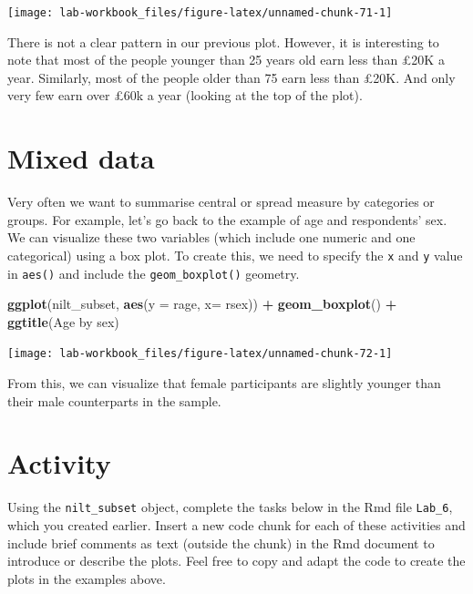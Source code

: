 \documentclass[
]{book}
\newenvironment{Shaded}{\begin{snugshade}}{\end{snugshade}}
\newcommand{\AttributeTok}[1]{\textcolor[rgb]{0.13,0.29,0.53}{#1}}
\newcommand{\FunctionTok}[1]{\textcolor[rgb]{0.13,0.29,0.53}{\textbf{#1}}}
\newcommand{\NormalTok}[1]{#1}
\newcommand{\SpecialCharTok}[1]{\textcolor[rgb]{0.81,0.36,0.00}{\textbf{#1}}}
\newcommand{\StringTok}[1]{\textcolor[rgb]{0.31,0.60,0.02}{#1}}
\begin{document}
\begin{flushleft}\texttt{[image: lab-workbook\_files/figure-latex/unnamed-chunk-71-1]} \end{flushleft}

There is not a clear pattern in our previous plot. However, it is interesting to note that most of the people younger than 25 years old earn less than £20K a year. Similarly, most of the people older than 75 earn less than £20K. And only very few earn over £60k a year (looking at the top of the plot).

\hypertarget{mixed-data}{%
\section{Mixed data}\label{mixed-data}}

Very often we want to summarise central or spread measure by categories or groups. For example, let's go back to the example of age and respondents' sex. We can visualize these two variables (which include one numeric and one categorical) using a box plot. To create this, we need to specify the \texttt{x} and \texttt{y} value in \texttt{aes()} and include the \texttt{geom\_boxplot()} geometry.

\begin{Shaded}
\begin{Highlighting}[]
\FunctionTok{ggplot}\NormalTok{(nilt\_subset, }\FunctionTok{aes}\NormalTok{(}\AttributeTok{y =}\NormalTok{ rage, }\AttributeTok{x=}\NormalTok{ rsex)) }\SpecialCharTok{+}
  \FunctionTok{geom\_boxplot}\NormalTok{() }\SpecialCharTok{+}
  \FunctionTok{ggtitle}\NormalTok{(}\StringTok{\textquotesingle{}Age by sex\textquotesingle{}}\NormalTok{)}
\end{Highlighting}
\end{Shaded}

\begin{flushleft}\texttt{[image: lab-workbook\_files/figure-latex/unnamed-chunk-72-1]} \end{flushleft}

From this, we can visualize that female participants are slightly younger than their male counterparts in the sample.

\hypertarget{activity-6}{%
\section{Activity}\label{activity-6}}

Using the \texttt{nilt\_subset} object, complete the tasks below in the Rmd file \texttt{Lab\_6}, which you created earlier. Insert a new code chunk for each of these activities and include brief comments as text (outside the chunk) in the Rmd document to introduce or describe the plots. Feel free to copy and adapt the code to create the plots in the examples above.
\end{document}
